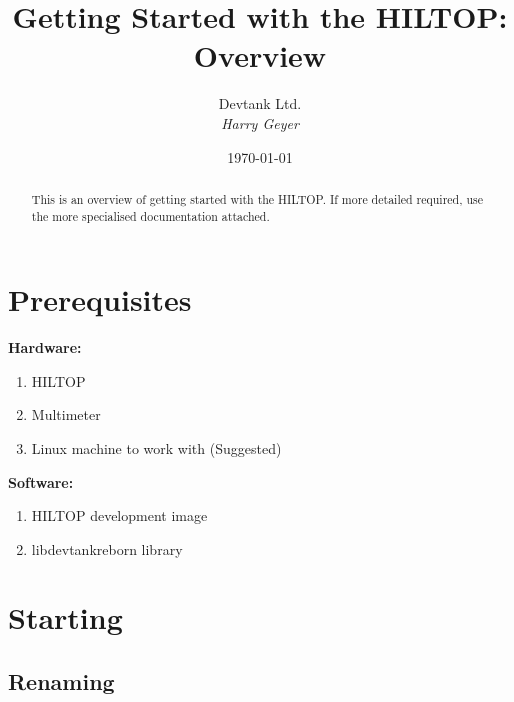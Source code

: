 \documentclass[a4paper,12pt, notitlepage]{article}
\begin{document}
\title{\textbf{\large{Getting Started with the HILTOP: Overview}}}

\author{\normalsize{Devtank Ltd.} \\
        \small\textit{
        Harry Geyer}}
\date{\today}

\maketitle 
\thispagestyle{fancy}


\begin{abstract} 
\noindent
This is an overview of getting started with the HILTOP. If more detailed required, use the more specialised documentation attached.
\end{abstract}
\vspace{11mm}

\newpage
\tableofcontents
\newpage

\section{Prerequisites}
\label{sec: prereq}

\textbf{Hardware:}

\begin{enumerate}
  \item HILTOP
  \item Multimeter
  \item Linux machine to work with (Suggested)
\end{enumerate}

\noindent
\textbf{Software:}

\begin{enumerate}
  \item HILTOP development image
  \item libdevtankreborn library
\end{enumerate}

\section{Starting}
\label{sec: start}

\subsection{Renaming}
\label{renameStart}
\end{document}
